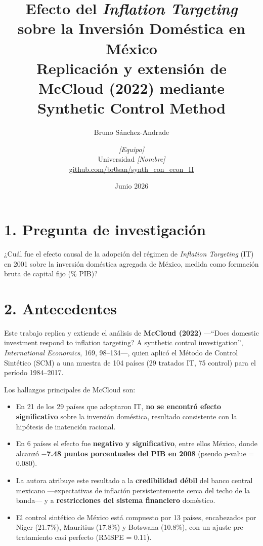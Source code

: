 \documentclass[11pt,a4paper]{article}
\title{\bfseries Efecto del \textit{Inflation Targeting} sobre la Inversión Doméstica en México\\[4pt]
       \large Replicación y extensión de McCloud (2022) mediante Synthetic Control Method}
\author{Bruno Sánchez-Andrade \and \textit{[Equipo]}\\[4pt]
        \small Universidad \textit{[Nombre]} \\ \small \href{https://github.com/br0san/synth_con_econ_II}{github.com/br0san/synth\_con\_econ\_II}}
\date{Junio 2026}
\begin{document}
\maketitle
\thispagestyle{empty}

\section*{1. Pregunta de investigación}

¿Cuál fue el efecto causal de la adopción del régimen de \textit{Inflation Targeting} (IT) en 2001 sobre la inversión doméstica agregada de México, medida como formación bruta de capital fijo (\% PIB)?

\section*{2. Antecedentes}

Este trabajo replica y extiende el análisis de \textbf{McCloud (2022)} —``Does domestic investment respond to inflation targeting? A synthetic control investigation'', \textit{International Economics}, 169, 98–134—, quien aplicó el Método de Control Sintético (SCM) a una muestra de 104 países (29 tratados IT, 75 control) para el período 1984–2017.

Los hallazgos principales de McCloud son:
\begin{itemize}[nosep]
    \item En 21 de los 29 países que adoptaron IT, \textbf{no se encontró efecto significativo} sobre la inversión doméstica, resultado consistente con la hipótesis de inatención racional.
    \item En 6 países el efecto fue \textbf{negativo y significativo}, entre ellos México, donde alcanzó \textbf{$-$7.48 puntos porcentuales del PIB en 2008} (pseudo $p$-value = 0.080).
    \item La autora atribuye este resultado a la \textbf{credibilidad débil} del banco central mexicano —expectativas de inflación persistentemente cerca del techo de la banda— y a \textbf{restricciones del sistema financiero} doméstico.
    \item El control sintético de México está compuesto por 13 países, encabezados por Níger (21.7\%), Mauritius (17.8\%) y Botswana (10.8\%), con un ajuste pre-tratamiento casi perfecto (RMSPE = 0.11).
\end{itemize}
\end{document}
